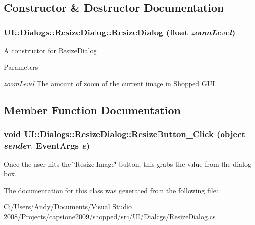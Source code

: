 \subsection{Constructor \& Destructor Documentation}
\hypertarget{class_u_i_1_1_dialogs_1_1_resize_dialog_affb5991256fd1dd4347433f8a0ce4134}{
\subsubsection[{ResizeDialog}]{\setlength{\rightskip}{0pt plus 5cm}UI::Dialogs::ResizeDialog::ResizeDialog (float {\em zoomLevel})}}
\label{class_u_i_1_1_dialogs_1_1_resize_dialog_affb5991256fd1dd4347433f8a0ce4134}
A constructor for \hyperlink{class_u_i_1_1_dialogs_1_1_resize_dialog}{ResizeDialog}


\begin{DoxyParams}{Parameters}
\item[{\em zoomLevel}]The amount of zoom of the current image in Shopped GUI \end{DoxyParams}


\subsection{Member Function Documentation}
\hypertarget{class_u_i_1_1_dialogs_1_1_resize_dialog_a4f6039a9f2ecb98483c75d5f050fb2e4}{
\subsubsection[{ResizeButton\_\-Click}]{\setlength{\rightskip}{0pt plus 5cm}void UI::Dialogs::ResizeDialog::ResizeButton\_\-Click (object {\em sender}, \/  EventArgs {\em e})}}
\label{class_u_i_1_1_dialogs_1_1_resize_dialog_a4f6039a9f2ecb98483c75d5f050fb2e4}
Once the user hits the \char`\"{}Resize Image\char`\"{} button, this grabs the value from the dialog box. 

The documentation for this class was generated from the following file:\begin{DoxyCompactItemize}
\item 
C:/Users/Andy/Documents/Visual Studio 2008/Projects/capstone2009/shopped/src/UI/Dialogs/ResizeDialog.cs\end{DoxyCompactItemize}
